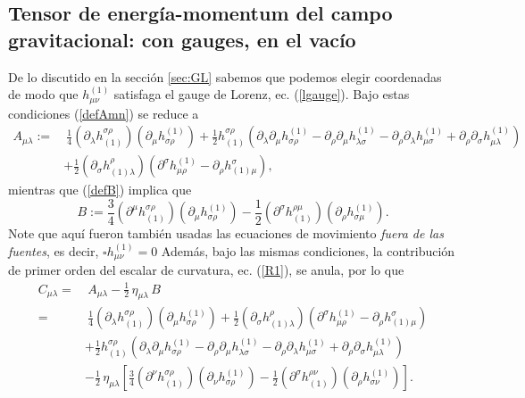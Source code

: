 \subsection{Tensor de energía-momentum del campo gravitacional: con gauges, en el vacío}
De lo discutido en la sección \ref{sec:GL} sabemos que podemos elegir coordenadas de modo que $h^{(1)}_{\mu\nu}$ satisfaga el gauge de Lorenz, ec. (\ref{lgauge}). Bajo estas condiciones (\ref{defAmn}) se reduce a
\begin{align}
A_{\mu\lambda} := & \ \frac{1}{4}(\partial_\lambda h^{\sigma\rho}_{(1)})
(\partial_\mu h_{\sigma\rho}^{(1)})+\frac{1}{2}h^{\sigma\rho}_{(1)}
\left(\partial_\lambda\partial_\mu h^{(1)}_{\sigma\rho}-\partial_\rho\partial_\mu
h^{(1)}_{\lambda\sigma}-\partial_\rho\partial_\lambda h^{(1)}_{\mu\sigma}
+ \partial_\rho\partial_\sigma h^{(1)}_{\mu\lambda}\right) \\
& + \frac{1}{2} (\partial_\sigma h^\rho_{(1)\lambda})\left(\partial^\sigma h^{(1)}_{\mu\rho}-\partial_\rho h^\sigma_{(1)\mu}\right),
\end{align}
mientras que (\ref{defB}) implica que
\begin{equation}
B := %
 \frac{3}{4}(\partial^\mu h_{(1)}^{\sigma\rho})(\partial_\mu h^{(1)}_{\sigma\rho}) -\frac{1}{2}(\partial^\sigma h_{(1)}^{\rho\mu})(\partial_\rho h^{(1)}_{\sigma\mu}) .
\end{equation}
Note que aquí fueron también usadas las ecuaciones de movimiento \textit{fuera de las fuentes}, es decir, $\square h^{(1)}_{\mu\nu}=0$
Además, bajo las mismas condiciones, la contribución de primer orden del escalar de curvatura, ec. (\ref{R1}), se anula, por lo que
\begin{align}
C_{\mu\lambda} =&\  A_{\mu\lambda}-\frac{1}{2}\,\eta_{\mu\lambda}\, B \\
 = & \  \frac{1}{4}(\partial_\lambda h^{\sigma\rho}_{(1)})
(\partial_\mu h_{\sigma\rho}^{(1)}) + \frac{1}{2} (\partial_\sigma h^\rho_{(1)\lambda})\left(\partial^\sigma h^{(1)}_{\mu\rho}-\partial_\rho h^\sigma_{(1)\mu}\right) \nonumber\\
& +\frac{1}{2}h^{\sigma\rho}_{(1)}
\left(\partial_\lambda\partial_\mu h^{(1)}_{\sigma\rho}-\partial_\rho\partial_\mu
h^{(1)}_{\lambda\sigma}-\partial_\rho\partial_\lambda h^{(1)}_{\mu\sigma}
+ \partial_\rho\partial_\sigma h^{(1)}_{\mu\lambda}\right)
\nonumber \\
& -\frac{1}{2}\,\eta_{\mu\lambda}\left[ \frac{3}{4}(\partial^\nu h_{(1)}^{\sigma\rho})(\partial_\nu h^{(1)}_{\sigma\rho})
-\frac{1}{2}(\partial^\sigma h_{(1)}^{\rho\nu})(\partial_\rho h^{(1)}_{\sigma\nu})\right] .
\end{align}

